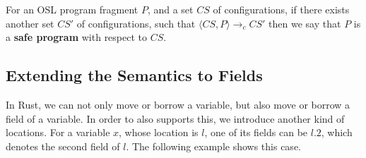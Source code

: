 \documentclass[runningheads]{llncs}
\def\codec#1{\texttt{#1}}
\newcommand{\cfg}[1]{\langle #1\rangle}
\begin{document}
\begin{definition}
	For an OSL program fragment $P$, and a set $CS$ of configurations,
	if there exists another set  $CS'$ of configurations, such that $\cfg{CS,P}\rightarrow_c CS'$ then
	we say that $P$ is a \textbf{safe program} with respect to $CS$.
\end{definition}

%

\subsection{Extending the Semantics to Fields}

In Rust, we can not only move or borrow a variable, but also move or borrow a field of
a variable. In order to also supports this, we introduce another kind of locations.
For a variable $x$, whose location is $l$, one of its fields can be $l.2$, which denotes the
second field of $l$.
The following example shows this case.
\end{document}
